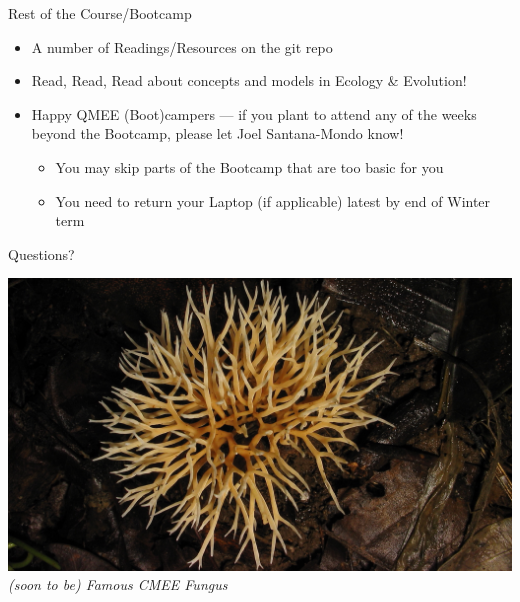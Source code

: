 \documentclass[xcolor={usenames,x11names},compress]{beamer}
\renewcommand{\(}{\begin{columns}}
\renewcommand{\)}{\end{columns}}
\newcommand{\<}[1]{\begin{column}{#1}}
\renewcommand{\>}{\end{column}}
\begin{document}
\begin{frame}{Rest of the Course/Bootcamp}

\begin{itemize}\itemsep12pt

\item A number of Readings/Resources on the git repo 

\item Read, Read, Read about concepts and models in Ecology \& Evolution!

\item Happy QMEE (Boot)campers --- if you plant to attend any of the weeks beyond the Bootcamp, please let Joel Santana-Mondo know!
		\begin{itemize}
    \item You may skip parts of the Bootcamp that are too basic for you 
    \item You need to return your Laptop (if applicable) latest by end of Winter term 
		\end{itemize}
		
		
\end{itemize}

\end{frame}
\begin{frame}{Questions?}

\centering
  \includegraphics[width=\textwidth]{CMEE_Fungus.jpg}\\
    {\it \small (soon to be) Famous CMEE Fungus}
  
\end{frame}
\end{document}
